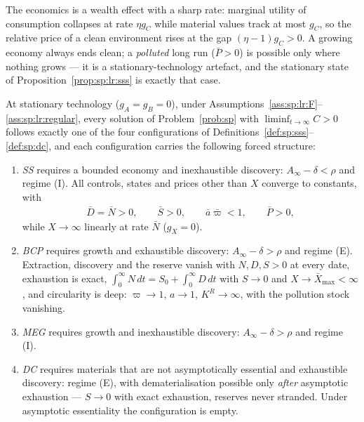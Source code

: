 The economics is a wealth effect with a sharp rate: marginal utility of consumption collapses
at rate $\eta g_C$ while material values track at most $g_C$, so the relative price of a clean
environment rises at the gap $\left(\eta-1\right)g_C>0$. A growing economy always ends clean;
a \emph{polluted} long run ($\bar P>0$) is possible only where nothing grows --- it is a
stationary-technology artefact, and the stationary state of
Proposition~\ref{prop:sp:lr:sss} is exactly that case.

\begin{theorem}
\label{thm:sp:lr:classification}
At stationary technology ($g_A=g_B=0$), under
Assumptions~\ref{ass:sp:lr:F}--\ref{ass:sp:lr:regular}, every solution of
Problem~\ref{prob:sp} with $\liminf_{t\to\infty}C>0$ follows exactly one of the four
configurations of Definitions~\ref{def:sp:sss}--\ref{def:sp:dc}, and each configuration carries
the following forced structure:
\begin{enumerate}
    \item \emph{SS} requires a bounded economy and inexhaustible discovery:
    $A_\infty-\delta<\rho$ and regime (I). All controls, states and prices other than $X$
    converge to constants, with
    \begin{align*}
    \bar D=\bar N>0,\qquad\bar S>0,\qquad\bar a\bar\varpi<1,\qquad\bar P>0,
    \end{align*}
    while $X\to\infty$ linearly at rate $\bar N$ ($g_X=0$).
    \item \emph{BCP} requires growth and exhaustible discovery: $A_\infty-\delta>\rho$ and
    regime (E). Extraction, discovery and the reserve vanish with $N,D,S>0$ at every date,
    exhaustion is exact,
    $\int_0^\infty N\,dt=S_0+\int_0^\infty D\,dt$ with $S\to0$ and $X\to\bar X_{\max}<\infty$,
    and circularity is deep: $\varpi\to1$, $a\to1$, $K^R\to\infty$, with the pollution stock
    vanishing.
    \item \emph{MEG} requires growth and inexhaustible discovery: $A_\infty-\delta>\rho$ and
    regime (I).
    \item \emph{DC} requires materials that are not asymptotically essential and exhaustible
    discovery: regime (E), with dematerialisation possible only \emph{after} asymptotic
    exhaustion --- $S\to0$ with exact exhaustion, reserves never stranded. Under asymptotic
    essentiality the configuration is empty.
\end{enumerate}
\end{theorem}

